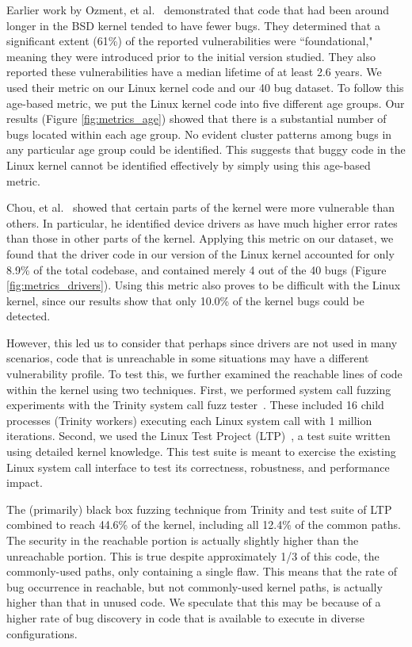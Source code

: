 Earlier work by Ozment, et al.~\cite{ozment2006milk} demonstrated that code that
had been around longer in the BSD kernel tended to have fewer bugs.
They determined that a significant extent (61\%) of the reported
vulnerabilities were ``foundational," meaning they were introduced prior to the
initial version studied. They also reported these vulnerabilities
have a median lifetime of at least 2.6 years.
We used their metric on our Linux kernel code and our 40 bug dataset.
To follow this age-based metric, we put the Linux kernel code into five different age groups. 
Our results (Figure \ref{fig:metrics_age}) showed that there is a substantial number of bugs located 
within each age group. No evident cluster patterns among bugs in any particular age group could be identified. 
This suggests that buggy code in the Linux kernel cannot be identified effectively
by simply using this age-based metric.

Chou, et al.~\cite{PittSFIeld} showed that certain parts of the kernel
were more vulnerable than others. In particular, he identified device drivers as
have much higher error rates than those in other parts of the kernel.
Applying this metric on our dataset, we found that the driver code in our version
of the Linux kernel accounted for only 8.9\% of the total codebase, and contained
merely 4 out of the 40 bugs (Figure \ref{fig:metrics_drivers}). 
Using this metric also proves to be difficult with the
Linux kernel, since our results show that
only 10.0\% of the kernel bugs could be detected.

However, this led us to consider that perhaps since drivers are not used
in many scenarios, code that is unreachable in some situations may have a
different vulnerability profile.  To test this, we
further examined the reachable lines of
code within the kernel using two techniques. First,
we performed system call fuzzing experiments with the Trinity
system call fuzz tester~\cite{Trinity}. These included 16 child processes
(Trinity workers) executing each Linux system call with 1 million iterations.
Second, we used the Linux Test Project (LTP)~\cite{LTP}, a test suite written
using detailed kernel knowledge. This test suite is meant to exercise the
existing Linux system call interface to
test its correctness, robustness, and performance impact.

The (primarily) black box fuzzing technique from Trinity and test suite of
LTP combined to reach 44.6\% of the kernel, including all 12.4\% of the common
paths.  The security in the reachable portion is actually
slightly higher than the unreachable portion. This is true despite
approximately 1/3 of this code, the commonly-used paths, only containing
a single flaw. This means that the rate of bug occurrence in reachable, but
not commonly-used kernel paths, is actually higher than that in unused
code. We speculate that this may be because of a higher rate of bug discovery
in code that is available to execute in diverse configurations.


